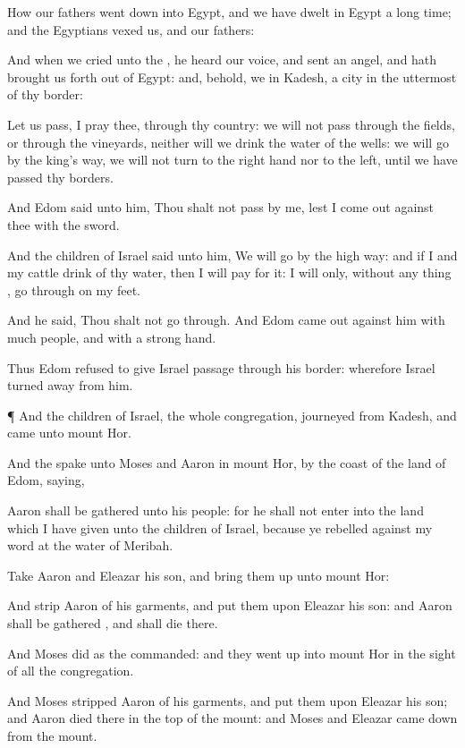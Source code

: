 {How our
fathers went
down into
Egypt, and we have
dwelt in
Egypt a
long
time; and the
Egyptians
vexed us, and our
fathers:

And when we
cried unto the
{}, he
heard our
voice, and
sent an
angel, and hath brought us
forth out of
Egypt: and, behold, we
{} in
Kadesh, a
city in the
uttermost of thy
border:

Let us
pass, I pray thee, through thy
country: we will not
pass through the
fields, or through the
vineyards, neither will we
drink
{} the
water of the
wells: we will
go by the
king’s
{}
way, we will not
turn to the right
hand nor to the
left, until we have
passed thy
borders.

And
Edom
said unto him, Thou shalt not
pass by me, lest I come
out
against thee with the
sword.

And the
children of
Israel
said unto him, We will
go by the high
way: and if I and my
cattle
drink of thy
water, then I will
pay for it: I will only, without
{} any
thing
{}, go
through on my
feet.

And he
said, Thou shalt not go
through. And
Edom came
out
against him with
much
people, and with a
strong
hand.

Thus
Edom
refused to
give
Israel
passage through his
border: wherefore
Israel turned
away from him.


\par }{\PP {}¶ And the
children of
Israel,
{} the whole
congregation,
journeyed from
Kadesh, and
came unto
mount
Hor.

And the
{}
spake unto
Moses and
Aaron in
mount
Hor, by the
coast of the
land of
Edom,
saying,

Aaron shall be
gathered unto his
people: for he shall not
enter into the
land which I have
given unto the
children of
Israel, because ye rebelled
against my
word at the
water of
Meribah.

Take
Aaron and
Eleazar his
son, and bring them
up unto
mount
Hor:

And
strip
Aaron of his
garments, and
put them upon
Eleazar his
son: and
Aaron shall be
gathered
{}, and shall
die there.

And
Moses
did as the
{}
commanded: and they went
up into
mount
Hor in the
sight of all the
congregation.

And
Moses
stripped
Aaron of his
garments, and
put them upon
Eleazar his
son; and
Aaron
died there in the
top of the
mount: and
Moses and
Eleazar came
down from the
mount.

}
